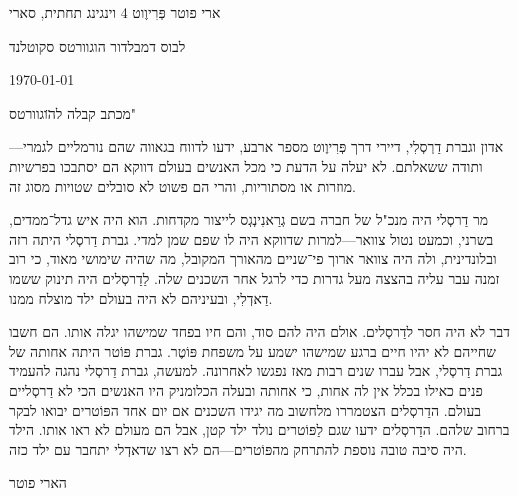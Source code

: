 \useOpTeX

\def\נושא{\subjec}
\helang \quotes %
\fontfam[culmus]


\hfill\address
 הארי פוטר
 פְּרִיוֶוט 4 
וינגינג תחתית, סארי

\bigskip

\address
  אלבוס דמבלדור
  הוגוורטס
  סקוטלנד

\hfill\today

\נושא מכתב קבלה ל\"הוגוורטס"

 אדון וגברת דַרְסְלִי, דיירי דרך פְּרִיוֶוט מספר ארבע, ידעו לדווח בגאווה שהם נורמליים לגמרי---ותודה ששאלתם. לא יעלה על הדעת כי מכל האנשים בעולם דווקא הם יסתבכו בפרשיות מוזרות או מסתוריות, והרי הם פשוט לא סובלים שטויות מסוג זה.

מר דַרסְלי היה מנכ"ל של חברה בשם גְרַאנִינְגְס לייצור מקדחות. הוא היה איש גדל־ממדים, בשרני, וכמעט נטול צוואר---למרות שדווקא היה לו שפם שמן למדי. גברת דַרסְלי היתה רזה ובלונדינית, ולה היה צוואר ארוך פי־שניים מהאורך המקובל, מה שהיה שימושי מאוד, כי רוב זמנה עבר עליה בהצצה מעל גדרות כדי לרגל אחר השכנים שלה. לַדַרסְלים היה תינוק ששמו דַאדְלִי, ובעיניהם לא היה בעולם ילד מוצלח ממנו.

דבר לא היה חסר לדַרסְלים. אולם היה להם סוד, והם חיו בפחד שמישהו יגלה אותו. הם חשבו שחייהם לא יהיו חיים ברגע שמישהו ישמע על משפחת פּוֹטֶר. גברת פּוֹטר היתה אחותה של גברת דַרסְלי, אבל עברו שנים רבות מאז נפגשו לאחרונה. למעשה, גברת דַרסְלי נהגה להעמיד פנים כאילו בכלל אין לה אחות, כי אחותה ובעלה הכלומניק היו האנשים הכי לא דַרסְליים בעולם. הדַרסְלים הצטמררו מלחשוב מה יגידו השכנים אם יום אחד הפּוֹטרים יבואו לבקר ברחוב שלהם. הדַרסְלים ידעו שגם לַפּוֹטרים נולד ילד קטן, אבל הם מעולם לא ראו אותו. הילד היה סיבה טובה נוספת להתרחק מהפּוֹטרים---הם לא רצו שדאדְלי יתחבר עם ילד כזה.
\bigskip %
\bigskip

הארי פוטר
\bye
